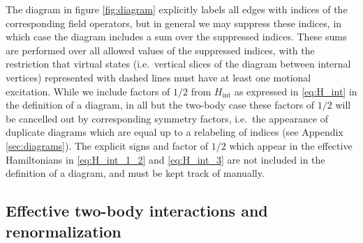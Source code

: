 \documentclass[preprint,showkeys,nofootinbib]{revtex4-1}
\renewcommand{\t}{\text} %
\newcommand{\1}{\mathds{1}}
\begin{document}
The diagram in figure \ref{fig:diagram} explicitly labels all edges
with indices of the corresponding field operators, but in general we
may suppress these indices, in which case the diagram includes a sum
over the suppressed indices.  These sums are performed over all
allowed values of the suppressed indices, with the restriction that
virtual states (i.e.~vertical slices of the diagram between internal
vertices) represented with dashed lines must have at least one
motional excitation.  While we include factors of $1/2$ from
$H_{\t{int}}$ as expressed in \eqref{eq:H_int} in the definition of a
diagram, in all but the two-body case these factors of $1/2$ will be
cancelled out by corresponding symmetry factors, i.e.~the appearance
of duplicate diagrams which are equal up to a relabeling of indices
(see Appendix \ref{sec:diagrams}).  The explicit signs and factor of
$1/2$ which appear in the effective Hamiltonians in
\eqref{eq:H_int_1_2} and \eqref{eq:H_int_3} are not included in the
definition of a diagram, and must be kept track of manually.

\subsection{Effective two-body interactions and renormalization}
\label{sec:two_body}
\end{document}
